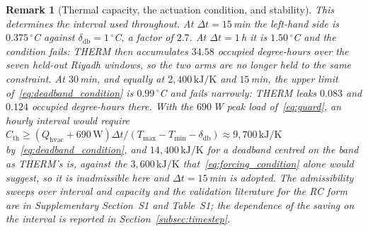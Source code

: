 \documentclass[pdflatex,sn-mathphys-num,iicol]{sn-jnl}
\theoremstyle{thmstyleone}\newtheorem{proposition}{Proposition}\newtheorem{corollary}{Corollary}
\theoremstyle{thmstyletwo}\newtheorem{remark}{Remark}\newtheorem{observation}{Observation}
\theoremstyle{thmstylethree}\newtheorem{definition}{Definition}
\newcommand{\Tmin}{T_{\min}}
\newcommand{\Tmax}{T_{\max}}
\newcommand{\deadband}{\delta_{\mathrm{db}}}
\newcommand{\Cth}{C_{\mathrm{th}}}
\newcommand{\Qhvac}{Q_{\mathrm{hvac}}}
\begin{document}
\begin{remark}[Thermal capacity, the actuation condition, and stability]
This determines the interval used throughout. At $\Delta t=15\,$min the left-hand side is $0.375\,^\circ$C against $\deadband=1\,^\circ$C, a factor of $2.7$. At $\Delta t=1\,$h it is $1.50\,^\circ$C and the condition fails: THERM then accumulates $34.58$ occupied degree-hours over the seven held-out Riyadh windows, so the two arms are no longer held to the same constraint. At $30\,$min, and equally at $2{,}400\,\text{kJ/K}$ and $15\,$min, the upper limit of~\eqref{eq:deadband_condition} is $0.99\,^\circ$C and fails narrowly: THERM leaks $0.083$ and $0.124$ occupied degree-hours there. With the $690\,$W peak load of~\eqref{eq:guard}, an hourly interval would require $\Cth\ge(\Qhvac+690\,\mathrm{W})\Delta t/(\Tmax-\Tmin-\deadband)\approx9{,}700\,\text{kJ/K}$ by~\eqref{eq:deadband_condition}, and $14{,}400\,\text{kJ/K}$ for a deadband centred on the band as THERM's is, against the $3{,}600\,\text{kJ/K}$ that~\eqref{eq:forcing_condition} alone would suggest, so it is inadmissible here and $\Delta t=15\,$min is adopted. The admissibility sweeps over interval and capacity and the validation literature for the RC form are in Supplementary Section~S1 and Table~S1; the dependence of the saving on the interval is reported in Section~\ref{subsec:timestep}.
\end{remark}
 
\end{document}
